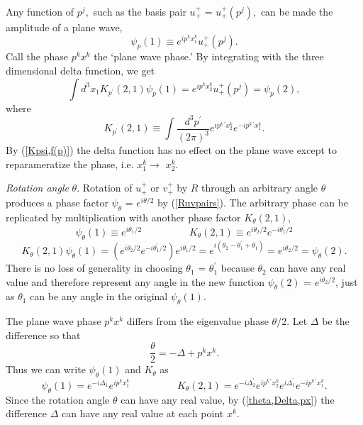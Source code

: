 \documentclass[a4paper,12pt]{article}
\begin{document}
	Any function of $p^{j},$ such as the basis pair $u_{+}^{+}$ = $u_{+}^{+}(p^{j}),$ can be made the amplitude of a plane wave,
\begin{equation}	\label{psi,f(p)}
\psi_{p}(1) \equiv e^{ip^{k} x_{1}^{k}} u_{+}^{+}(p^{j}).
\end{equation}
Call the phase $p^{k} x^{k}$ the `plane wave phase.' By integrating with the three dimensional delta function, we get
\begin{equation}	\label{Kpsi,f(p)}
  \int d^{3} x_{1} K_{p^{\prime}}(2,1) \psi_{p}(1) =  e^{ip^{k} x_{2}^{k}} u_{+}^{+}(p^{j}) = \psi_{p}(2),
\end{equation}
where 
\begin{equation}	\label{K,f(p)}
K_{p^{\prime}}(2,1) \equiv \int \frac{d^3 p^{ \prime} }{(2 \pi)^3} e^{i p^{k \, \prime} x_{2}^{k}} e^{- i p^{k \, \prime} x_{1}^{k}}.
\end{equation} 
By (\ref{Kpsi,f(p)}) the delta function has no effect on the plane wave except to reparameratize the phase, i.e. $x_{1}^{k} \rightarrow$ $x_{2}^{k}.$

	{\textit{Rotation angle}} $\theta$. Rotation of $u_{+}^{+}$ or $v_{+}^{+}$ by $R$ through an arbitrary angle $\theta$ produces a phase factor $\psi_{\theta}$ = $e^{i \theta/2}$ by (\ref{Ruvpairs}). The arbitrary phase can be replicated by multiplication with another phase factor $K_{\theta}(2,1),$ 
\begin{equation}  \label{psi,theta}
\psi_{\theta}(1) \equiv e^{i\theta_{1}/2} \hspace{2cm}
K_{\theta}(2,1) \equiv e^{i\theta_{2}/2 } e^{-i\theta_{1}^{\prime}/2}
\end{equation}
\begin{equation}  \label{Kpsi,theta}
K_{\theta}(2,1) \psi_{\theta}(1) = (e^{i\theta_{2}/2 } e^{-i\theta_{1}^{\prime}/2}) e^{i\theta_{1}/2}
=  e^{i(\theta_{2} - \theta_{1}^{\prime} + \theta_{1})} = e^{i\theta_{2}/2} = \psi_{\theta}(2).
\end{equation} 
There is no loss of generality in choosing $\theta_{1}$ = $\theta_{1}^{\prime}$ because $\theta_{2}$ can have any real value and therefore represent any angle in the new function $\psi_{\theta}(2)$ = $e^{i \theta_{2} / 2}$, just as $\theta_{1}$ can be any angle in the original $\psi_{\theta}(1).$ 

	The plane wave phase $ p^{k} x^{k}$ differs from the eigenvalue phase $\theta/2.$ Let $\Delta$ be the difference so that 
\begin{equation} \label{theta,Delta,px}
\frac{\theta}{2} = -\Delta + p^{k} x^{k}.
\end{equation}
Thus we can write $\psi_{\theta}(1)$ and $K_{\theta}$ as 
\begin{equation}	\label{psi,Delta,p}
\psi_{\theta}(1) = e^{-i \Delta_{1}} e^{ i p^{k} x_{1}^{k}} \hspace{2cm} 
K_{\theta}(2,1) = e^{-i \Delta_{2}^{\prime}} e^{ i p^{k \, \prime} x_{2}^{k}} e^{i \Delta_{1}^{\prime}} e^{  -i p^{k \, \prime} x_{1}^{k}} .
\end{equation}
Since the rotation angle $\theta$ can have any real value, by (\ref{theta,Delta,px}) the difference $\Delta$ can have any real value at each point $x^{k}.$
\end{document}
